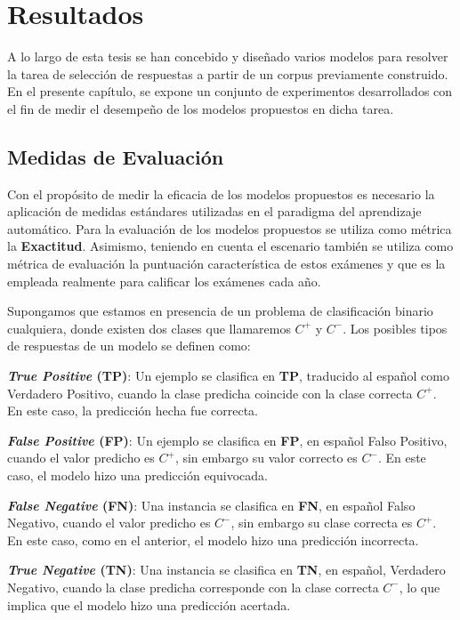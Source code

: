 \chapter{Resultados}\label{chapter:results}

A lo largo de esta tesis se han concebido y diseñado varios modelos para resolver la tarea de selección de respuestas a partir de un corpus previamente construido. En el presente capítulo, se expone un conjunto de experimentos desarrollados con el fin de medir el desempeño de los modelos propuestos en dicha tarea.

\section{Medidas de Evaluación}

Con el propósito de medir la eficacia de los modelos propuestos es necesario la aplicación de medidas estándares utilizadas en el paradigma del aprendizaje automático. Para la evaluación de los modelos propuestos se utiliza como métrica la \textbf{Exactitud}. Asimismo, teniendo en cuenta el escenario también se utiliza como métrica de evaluación la puntuación característica de estos exámenes y que es la empleada realmente para calificar los exámenes cada año.

Supongamos que estamos en presencia de un problema de clasificación binario cualquiera, donde existen dos clases que llamaremos $C^{+}$ y $C^{-}$. Los posibles tipos de respuestas de un modelo se definen como:

\begin{description}
  \item \textbf{\textit{True Positive} (TP)}: Un ejemplo se clasifica en \textbf{TP}, traducido al español como Verdadero Positivo, cuando la clase predicha coincide con la clase correcta $C^{+}$. En este caso, la predicción hecha fue correcta.
  \item \textbf{\textit{False Positive} (FP)}: Un ejemplo se clasifica en \textbf{FP}, en español Falso Positivo, cuando el valor predicho es $C^{+}$, sin embargo su valor correcto es $C^{-}$. En este caso, el modelo hizo una predicción equivocada.
  \item \textbf{\textit{False Negative} (FN)}: Una instancia se clasifica en \textbf{FN}, en español Falso Negativo, cuando el valor predicho es $C^{-}$, sin embargo su clase correcta es $C^{+}$. En este caso, como en el anterior, el modelo hizo una predicción incorrecta.
  \item \textbf{\textit{True Negative} (TN)}: Una instancia se clasifica en \textbf{TN}, en español, Verdadero Negativo, cuando la clase predicha corresponde con la clase correcta $C^{-}$, lo que implica que el modelo hizo una predicción acertada.
\end{description}

